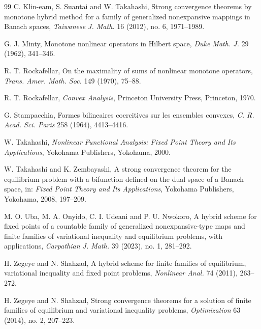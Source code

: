 \documentclass[leqno,12pt]{amsart}
\theoremstyle{definition}
\numberwithin{equation}{section}
\begin{document}
\begin{thebibliography}{99}
C. Klin-eam, S. Suantai and W. Takahashi, Strong convergence theorems by monotone hybrid method for a family of generalized nonexpansive mappings in Banach spaces, \emph{Taiwanese J. Math.} 16 (2012), no. 6, 1971--1989.


G. J. Minty, Monotone nonlinear operators in Hilbert space, \emph{Duke Math. J.} 29 (1962), 341--346.

R. T. Rockafellar, On the maximality of sums of nonlinear monotone operators, \emph{Trans. Amer. Math. Soc.} 149 (1970), 75--88.

R. T. Rockafellar, \emph{Convex Analysis}, Princeton University Press, Princeton, 1970.

G. Stampacchia, Formes bilineaires coercitives sur les ensembles convexes, \emph{C. R. Acad. Sci. Paris} 258 (1964), 4413--4416.

W. Takahashi, \emph{Nonlinear Functional Analysis: Fixed Point Theory and Its Applications}, Yokohama Publishers, Yokohama, 2000.

W. Takahashi and K. Zembayashi, A strong convergence theorem for the equilibrium problem with a bifunction defined on the dual space of a Banach space, in: \emph{Fixed Point Theory and Its Applications}, Yokohama Publishers, Yokohama, 2008, 197--209.

M. O. Uba, M. A. Onyido, C. I. Udeani and P. U. Nwokoro, A hybrid scheme for fixed points of a countable family of generalized nonexpansive-type maps and finite families of variational inequality and equilibrium problems, with applications, \emph{Carpathian J. Math.} 39 (2023), no. 1, 281--292.


H. Zegeye and N. Shahzad, A hybrid scheme for finite families of equilibrium, variational inequality and fixed point problems, \emph{Nonlinear Anal.} 74 (2011), 263--272.

H. Zegeye and N. Shahzad, Strong convergence theorems for a solution of finite families of equilibrium and variational inequality problems, \emph{Optimization} 63 (2014), no. 2, 207--223.

\end{thebibliography}
\end{document}
